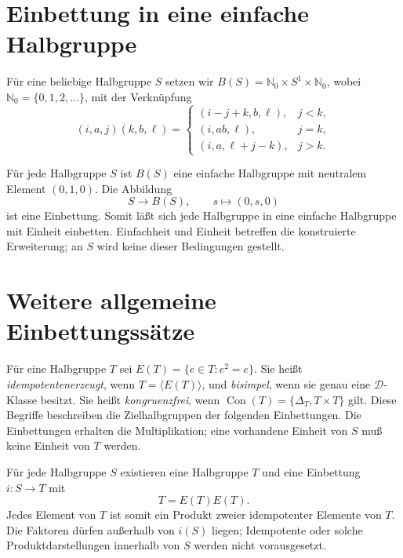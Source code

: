 \section{Einbettung in eine einfache Halbgruppe}

\begin{definition}
Für eine beliebige Halbgruppe $S$ setzen wir
$B(S)=\mathbb N_0\times S^1\times\mathbb N_0$,
wobei $\mathbb N_0=\{0,1,2,\ldots\}$, mit der Verknüpfung
\[
 (i,a,j)(k,b,\ell)=
 \begin{cases}
 (i-j+k,b,\ell),&j<k,\\
 (i,ab,\ell),&j=k,\\
 (i,a,\ell+j-k),&j>k.
 \end{cases}
\]
\end{definition}

\begin{theorem}
\label{b28guide:thm:bruck}
Für jede Halbgruppe $S$ ist $B(S)$ eine einfache Halbgruppe
mit neutralem Element $(0,1,0)$. Die Abbildung
\[
 S\longrightarrow B(S),\qquad s\longmapsto(0,s,0)
\]
ist eine Einbettung. Somit läßt sich jede Halbgruppe in eine
einfache Halbgruppe mit Einheit einbetten.
Einfachheit und Einheit betreffen die konstruierte Erweiterung;
an $S$ wird keine dieser Bedingungen gestellt.
\cite{munn1968}
\end{theorem}
\clearpage
\section{Weitere allgemeine Einbettungssätze}

\begin{definition}
Für eine Halbgruppe $T$ sei $E(T)=\{e\in T:e^2=e\}$.
Sie heißt \emph{idempotentenerzeugt}, wenn $T=\langle E(T)\rangle$,
und \emph{bisimpel}, wenn sie genau eine $\mathcal D$-Klasse besitzt.
Sie heißt \emph{kongruenzfrei}, wenn
$\operatorname{Con}(T)=\{\Delta_T,T\times T\}$ gilt.
Diese Begriffe beschreiben die Zielhalbgruppen der folgenden
Einbettungen. Die Einbettungen erhalten die Multiplikation;
eine vorhandene Einheit von $S$ muß keine Einheit von $T$ werden.
\end{definition}

\begin{theorem}
\label{b28guide:thm:higgins}
Für jede Halbgruppe $S$ existieren eine Halbgruppe $T$ und
eine Einbettung $i:S\to T$ mit
\[
 T=E(T)E(T).
\]
Jedes Element von $T$ ist somit ein Produkt zweier idempotenter Elemente
von $T$. Die Faktoren dürfen außerhalb von $i(S)$ liegen;
Idempotente oder solche Produktdarstellungen innerhalb von $S$
werden nicht vorausgesetzt.
\cite{higgins1995,oliveira2014}
\end{theorem}

